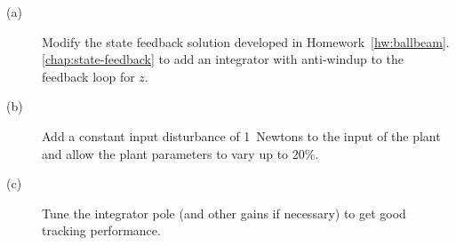 \begin{description}
\item[(a)] Modify the state feedback solution developed in Homework~\ref{hw:ballbeam}.\ref{chap:state-feedback} to add an integrator with anti-windup to the feedback loop for $z$.
\item[(b)] Add a constant input disturbance of 1~Newtons to the input of the plant and allow the plant parameters to vary up to 20\%.
\item[(c)] Tune the integrator pole (and other gains if necessary) to get good tracking performance.
\end{description}

